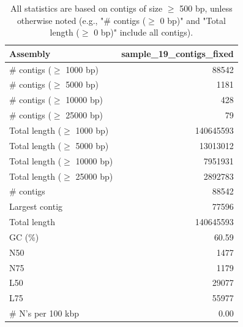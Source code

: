 \documentclass[12pt,a4paper]{article}
\begin{document}
\begin{table}[ht]
\begin{center}
\caption{All statistics are based on contigs of size $\geq$ 500 bp, unless otherwise noted (e.g., "\# contigs ($\geq$ 0 bp)" and "Total length ($\geq$ 0 bp)" include all contigs).}
\begin{tabular}{|l*{1}{|r}|}
\hline
Assembly & sample\_19\_contigs\_fixed \\ \hline
\# contigs ($\geq$ 1000 bp) & 88542 \\ \hline
\# contigs ($\geq$ 5000 bp) & 1181 \\ \hline
\# contigs ($\geq$ 10000 bp) & 428 \\ \hline
\# contigs ($\geq$ 25000 bp) & 79 \\ \hline
Total length ($\geq$ 1000 bp) & 140645593 \\ \hline
Total length ($\geq$ 5000 bp) & 13013012 \\ \hline
Total length ($\geq$ 10000 bp) & 7951931 \\ \hline
Total length ($\geq$ 25000 bp) & 2892783 \\ \hline
\# contigs & 88542 \\ \hline
Largest contig & 77596 \\ \hline
Total length & 140645593 \\ \hline
GC (\%) & 60.59 \\ \hline
N50 & 1477 \\ \hline
N75 & 1179 \\ \hline
L50 & 29077 \\ \hline
L75 & 55977 \\ \hline
\# N's per 100 kbp & 0.00 \\ \hline
\end{tabular}
\end{center}
\end{table}
\end{document}
